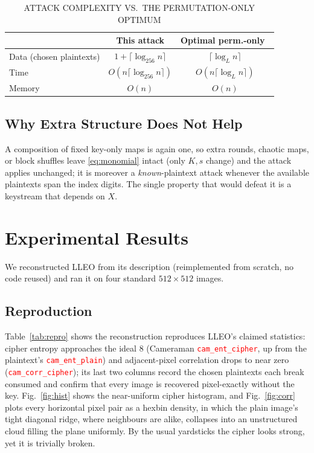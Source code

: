 \documentclass[conference,a4paper]{IEEEtran}
\newcommand{\PH}[1]{\textcolor{red}{\texttt{#1}}}
\begin{document}
\begin{table}[t]
\centering
\caption{ATTACK COMPLEXITY VS.\ THE PERMUTATION-ONLY OPTIMUM}
\label{tab:complexity}
\setlength{\tabcolsep}{4pt}
\begin{tabular}{|l|c|c|}
\hline
\textbf{} & \textbf{This attack} & \textbf{Optimal perm.-only~\cite{li2011optimal}} \\
\hline
Data (chosen plaintexts) & $1+\lceil\log_{256} n\rceil$ & $\lceil\log_{L} n\rceil$ \\
\hline
Time  & $O(n\lceil\log_{256} n\rceil)$ & $O(n\lceil\log_{L} n\rceil)$ \\
\hline
Memory & $O(n)$ & $O(n)$ \\
\hline
\end{tabular}
\end{table}

\subsection{Why Extra Structure Does Not Help}
A composition of fixed key-only maps is again one, so extra rounds, chaotic maps, or block shuffles leave
\eqref{eq:monomial} intact (only $K,s$ change) and the attack applies unchanged; it is moreover a
\emph{known}-plaintext attack whenever the available plaintexts span the index digits. The single
property that would defeat it is a keystream that depends on $X$.

\section{Experimental Results}\label{sec:results}
We reconstructed LLEO from its description (reimplemented from scratch, no code reused) and ran it on
four standard $512\times512$ images.

\subsection{Reproduction}
Table~\ref{tab:repro} shows the reconstruction reproduces LLEO's claimed statistics: cipher entropy
approaches the ideal 8 (Cameraman \PH{cam_ent_cipher}, up from the plaintext's \PH{cam_ent_plain}) and
adjacent-pixel correlation drops to near zero (\PH{cam_corr_cipher}); its last two columns record the
chosen plaintexts each break consumed and confirm that every image is recovered pixel-exactly without the
key. Fig.~\ref{fig:hist} shows the near-uniform cipher histogram, and Fig.~\ref{fig:corr} plots every
horizontal pixel pair as a hexbin density, in which the plain image's tight diagonal ridge, where
neighbours are alike, collapses into an unstructured cloud filling the plane uniformly. By the usual
yardsticks the cipher looks strong, yet it is trivially broken.
\end{document}
